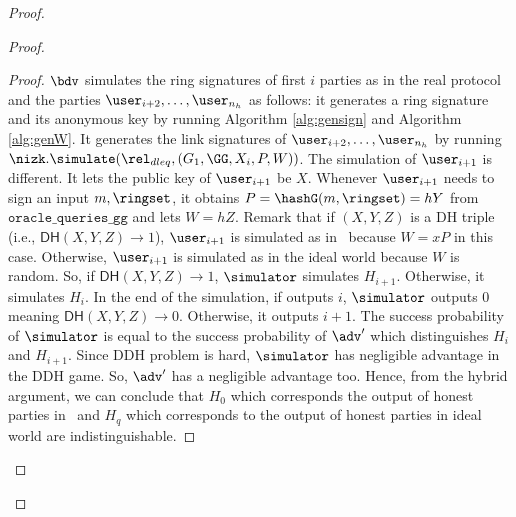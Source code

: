 \begin{proof}
\begin{proof}
\begin{proof}
			
			$\bdv $ simulates the ring signatures of first $ i $ parties as in the real protocol and the parties $ \user_{i+2}, \ldots, \user_{n_h} $ as follows: it generates a ring signature and its anonymous key by running Algorithm \ref{alg:gensign} and Algorithm \ref{alg:genW}. It generates the link signatures of $ \user_{i+2}, \ldots, \user_{n_h} $ by running $ \nizk.\simulate(\rel_{dleq}, (G_1, \GG,X_i, P,W)) $. The simulation of $ \user_{i + 1} $ is different. It lets the public key of $ \user_{i + 1} $ be $ X$. Whenever $ \user_{i+1} $ needs to sign an input $ m, \ringset $, it obtains $ P = \hashG(m, \ringset) = hY $ from $ \mathtt{oracle\_queries\_gg} $ and lets $ W = hZ $. Remark that if $ (X,Y,Z)$ is a DH triple (i.e., $  \mathsf{DH}(X,Y,Z) \rightarrow 1 $), $ \user_{i+1} $ is simulated as in \name \ because $ W = xP $ in this case. Otherwise, $ \user_{i+1} $ is simulated as in the ideal world because $ W $ is random. So, if $  \mathsf{DH}(X,Y,Z)  \rightarrow 1$, $\simulator $ simulates $ H_{i+1} $. Otherwise, it simulates $ H_{i} $. In the end of the simulation, if \adv outputs $ i $, $\simulator $ outputs $ 0 $ meaning $  \mathsf{DH}(X,Y,Z) \rightarrow 0$. Otherwise, it outputs $ i + 1 $. The success probability of $\simulator $ is equal to the success probability of $ \adv' $ which distinguishes $ H_i $ and $ H_{i +1} $. Since DDH problem is hard, $\simulator $ has negligible advantage in the DDH game. So, $ \adv' $ has a negligible advantage too. Hence, from the hybrid argument, we can conclude that $ H_0    $ which corresponds the output of honest parties in  \name\ and $ H_q  $ which corresponds to  the output of honest parties in ideal world are indistinguishable.
			

\end{proof}
\end{proof}
\end{proof}
